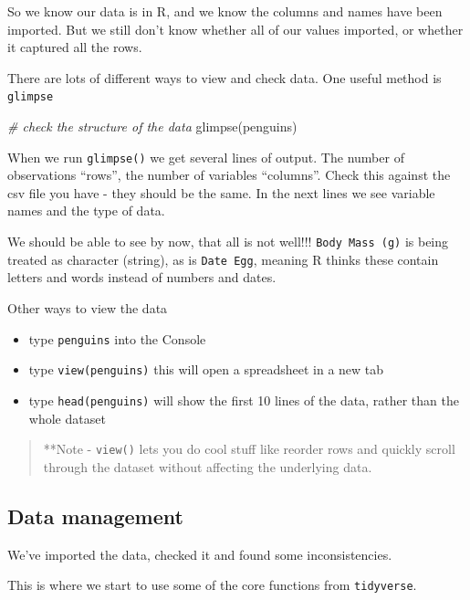 \documentclass[
]{book}
\newenvironment{Shaded}{\begin{snugshade}}{\end{snugshade}}
\newcommand{\CommentTok}[1]{\textcolor[rgb]{0.56,0.35,0.01}{\textit{#1}}}
\newcommand{\FunctionTok}[1]{\textcolor[rgb]{0.00,0.00,0.00}{#1}}
\newcommand{\NormalTok}[1]{#1}
\begin{document}
So we know our data is in R, and we know the columns and names have been imported. But we still don't know whether all of our values imported, or whether it captured all the rows.

There are lots of different ways to view and check data. One useful method is \texttt{glimpse}

\begin{Shaded}
\begin{Highlighting}[]
\CommentTok{\# check the structure of the data}
\FunctionTok{glimpse}\NormalTok{(penguins)}
\end{Highlighting}
\end{Shaded}

When we run \texttt{glimpse()} we get several lines of output. The number of observations ``rows'', the number of variables ``columns''. Check this against the csv file you have - they should be the same. In the next lines we see variable names and the type of data.

We should be able to see by now, that all is not well!!! \texttt{Body\ Mass\ (g)} is being treated as character (string), as is \texttt{Date\ Egg}, meaning R thinks these contain letters and words instead of numbers and dates.

Other ways to view the data

\begin{itemize}
\item
  type \texttt{penguins} into the Console
\item
  type \texttt{view(penguins)} this will open a spreadsheet in a new tab
\item
  type \texttt{head(penguins)} will show the first 10 lines of the data, rather than the whole dataset
\end{itemize}

\begin{quote}
**Note - \texttt{view()} lets you do cool stuff like reorder rows and quickly scroll through the dataset without affecting the underlying data.
\end{quote}

\hypertarget{data-management}{%
\subsection{Data management}\label{data-management}}

We've imported the data, checked it and found some inconsistencies.

This is where we start to use some of the core functions from \texttt{tidyverse}.
\end{document}
